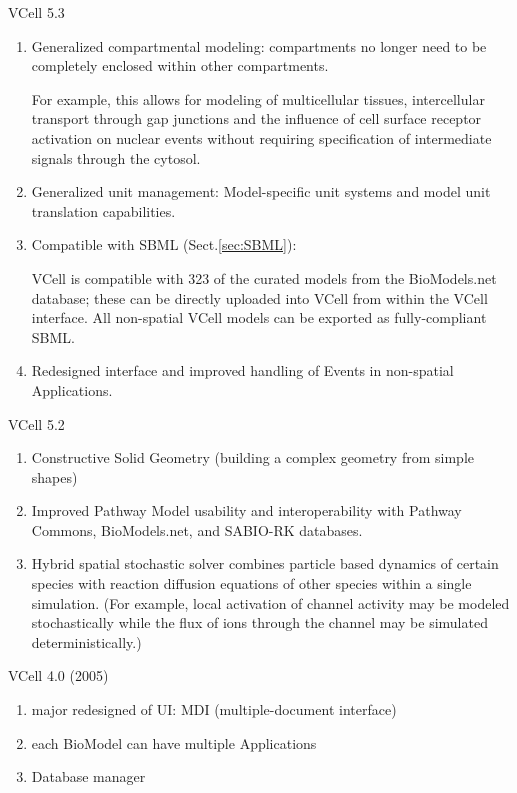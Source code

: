 VCell 5.3
\begin{enumerate}
  \item Generalized compartmental modeling: compartments no longer need to be
  completely enclosed within other compartments. 
  
  For example, this allows for modeling of multicellular tissues, intercellular
  transport through gap junctions and the influence of cell surface receptor
  activation on nuclear events without requiring specification of intermediate
  signals through the cytosol.

 
 \item Generalized unit management: Model-specific unit systems and model unit
 translation capabilities.  
 
 \item Compatible with SBML (Sect.\ref{sec:SBML}):

 VCell is compatible with 323 of the curated models from the BioModels.net
 database; these can be directly uploaded into VCell from within the VCell
 interface. All non-spatial VCell models can be exported as fully-compliant
 SBML.
 
 
 \item Redesigned interface and improved handling of Events in non-spatial
 Applications.
\end{enumerate}

VCell 5.2
\begin{enumerate}
  \item  Constructive Solid Geometry (building a complex geometry from simple
  shapes)
  
  \item Improved Pathway Model usability and interoperability with Pathway
  Commons, BioModels.net, and SABIO-RK databases.
  
  \item Hybrid spatial stochastic solver combines particle based dynamics of
  certain species with reaction diffusion equations of other species within a
  single simulation. (For example, local activation of channel activity may be
  modeled stochastically while the flux of ions through the channel may be
  simulated deterministically.)   
\end{enumerate}

VCell 4.0 (2005)
\begin{enumerate}
  \item major redesigned of UI: MDI (multiple-document interface)
  \item each BioModel can have multiple Applications
  \item Database manager
\end{enumerate}

